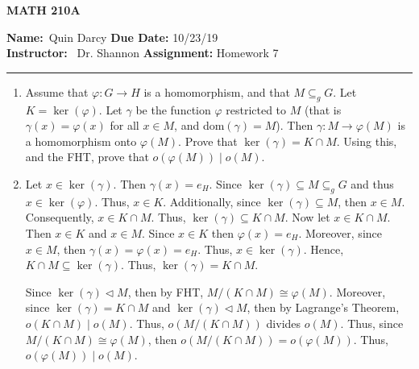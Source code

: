 \documentclass[12pt]{article}
\makeatletter
\theoremstyle{definition}
\theoremstyle{remark}
\renewenvironment{proof}[1][\proofname]{\par
  \pushQED{\qed}%
  \normalfont \topsep6\p@\@plus6\p@\relax
  \list{}{\leftmargin=0mm
          \rightmargin=4mm
          \settowidth{\itemindent}{\itshape#1}%
          \labelwidth=\itemindent
          \parsep=0pt \listparindent=\parindent 
  }
  \item[\hskip\labelsep
        \itshape
    #1\@addpunct{.}]\ignorespaces
}{%
  \popQED\endlist\@endpefalse
}
\let\oldproofname=\proofname
\renewcommand{\proofname}{\bf{\textit{\oldproofname}}}
\makeatother
\begin{document}
\begin{center}
	\vspace{.4cm} {\textbf { \large MATH 210A}}
\end{center}
{\textbf{Name:}\ Quin Darcy \hspace{\fill} \textbf{Due Date:} 10/23/19   \\
{ \textbf{Instructor:}} \ Dr. Shannon \hspace{\fill} \textbf{Assignment:} Homework 7 \\ \hrule}

\justifying

    \begin{enumerate}[leftmargin=*]
        \item Assume that $\varphi\colon G\rightarrow H$ is a homomorphism, and that $M\subseteq_g G$. Let $K=\ker(\varphi)$. Let $\gamma$ be the function $\varphi$ restricted to $M$ (that is $\gamma(x)=\varphi(x)$ for all $x\in M$, and dom$(\gamma)=M$). Then $\gamma\colon M\rightarrow\varphi(M)$ is a homomorphism onto $\varphi(M)$. Prove that $\ker(\gamma)=K\cap M$. Using this, and the FHT, prove that $o(\varphi(M))\mid o(M)$.
            \begin{proof}
                Let $x\in\ker(\gamma)$. Then $\gamma(x)=e_H$. Since $\ker(\gamma)\subseteq M\subseteq_g G$ and thus $x\in\ker(\varphi)$. Thus, $x\in K$. Additionally, since $\ker(\gamma)\subseteq M$, then $x\in M$. Consequently, $x\in K\cap M$. Thus, $\ker(\gamma)\subseteq K\cap M$. Now let $x\in K\cap M$. Then $x\in K$ and $x\in M$. Since $x\in K$ then $\varphi(x)=e_H$. Moreover, since $x\in M$, then $\gamma(x)=\varphi(x)=e_H$. Thus, $x\in\ker(\gamma)$. Hence, $K\cap M\subseteq\ker(\gamma)$. Thus, $\ker(\gamma)=K\cap M$.\par\hspace{4mm} Since $\ker(\gamma)\triangleleft M$, then by FHT, $M/(K\cap M)\cong \varphi(M)$. Moreover, since $\ker(\gamma)=K\cap M$ and $\ker(\gamma)\triangleleft M$, then by Lagrange's Theorem, $o(K\cap M)\mid o(M)$. Thus, $o(M/(K\cap M))$ divides $o(M)$. Thus, since $M/(K\cap M)\cong\varphi(M)$, then $o(M/(K\cap M))=o(\varphi(M))$. Thus, $o(\varphi(M))\mid o(M)$.
            \end{proof}
            

\end{enumerate}
\end{document}
